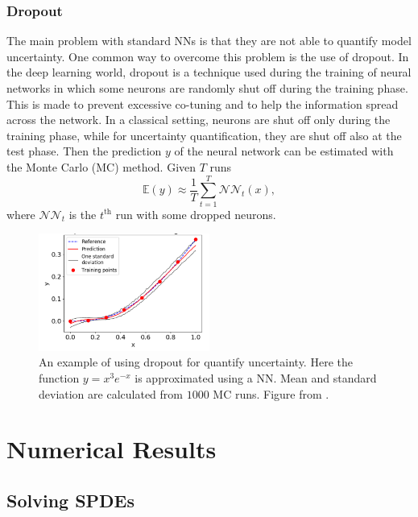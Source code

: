 \documentclass[11pt,a4paper]{article}
\begin{document}
\subsubsection{Dropout}

The main problem with standard NNs is that they are not able to quantify model uncertainty. One common way to overcome this problem is the use of dropout. In the deep learning world, dropout is a technique used during the training of neural networks in which some neurons are randomly shut off during the training phase. This is made to prevent excessive co-tuning and to help the information spread across the network. In a classical setting, neurons are shut off only during the training phase, while for uncertainty quantification, they are shut off also at the test phase. Then the prediction \(y\) of the neural network can be estimated with the Monte Carlo (MC) method. Given \(T\) runs 
\[
    \mathbb{E}(y) \approx \frac{1}{T} \sum_{t=1}^{T}\mathcal{NN}_t(x),
\]
where \(\mathcal{NN}_t\) is the \(t^{\text{th}}\) run with some dropped neurons.

\begin{figure}[H]
    \centering 
    \includegraphics[width=0.5\textwidth]{Images/Dropout_example.png}
    \captionsetup{justification=centering,margin=1cm}
    \caption{An example of using dropout for quantify uncertainty. Here the function \(y = x^3e^{-x}\) is approximated using a NN. Mean and standard deviation are calculated from \(1000\) MC runs. Figure from \cite{Zhang_2019}.}
\end{figure}
\section{Numerical Results}

\subsection{Solving SPDEs}
\end{document}
